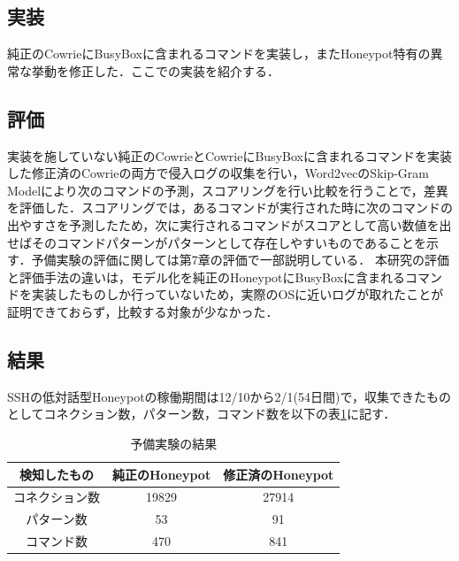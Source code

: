 \subsection{実装}
\label{eval:impl}
純正のCowrieにBusyBoxに含まれるコマンドを実装し，またHoneypot特有の異常な挙動を修正した．ここでの実装を紹介する．

\subsection{評価}
\label{eval:eval}
実装を施していない純正のCowrieとCowrieにBusyBoxに含まれるコマンドを実装した修正済のCowrieの両方で侵入ログの収集を行い，Word2vecのSkip-Gram Modelにより次のコマンドの予測，スコアリングを行い比較を行うことで，差異を評価した．スコアリングでは，あるコマンドが実行された時に次のコマンドの出やすさを予測したため，次に実行されるコマンドがスコアとして高い数値を出せばそのコマンドパターンがパターンとして存在しやすいものであることを示す．予備実験の評価に関しては第7章の評価で一部説明している．
本研究の評価と評価手法の違いは，モデル化を純正のHoneypotにBusyBoxに含まれるコマンドを実装したものしか行っていないため，実際のOSに近いログが取れたことが証明できておらず，比較する対象が少なかった．

\subsection{結果}
\label{eval:conc}
SSHの低対話型Honeypotの稼働期間は12/10から2/1(54日間)で，収集できたものとしてコネクション数，パターン数，コマンド数を以下の表\ref{table:kenchi}に記す．

\vspace{3mm}
\newlength{\myheighta}
\setlength{\myheighta}{10mm}
\begin{table}[h]
 \caption{予備実験の結果}
 \label{table:kenchi}
 \centering
  \begin{tabular}{|c||c|c|}
   \hline
   \parbox[c][\myheighta][c]{0cm}{} 検知したもの & 純正のHoneypot & 修正済のHoneypot \\
   \hline \hline 
     \parbox[c][\myheighta][c]{0cm}{} コネクション数  & 19829 & 27914 \\
     \hline
     \parbox[c][\myheighta][c]{0cm}{} パターン数  & 53 & 91 \\
     \hline
     \parbox[c][\myheighta][c]{0cm}{} コマンド数  & 470 & 841 \\
     \hline
  \end{tabular}
\end{table}
\vspace{5mm}

